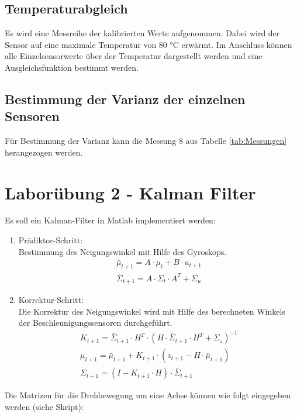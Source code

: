 \subsection{Temperaturabgleich}
Es wird eine Messreihe der kalibrierten Werte aufgenommen. Dabei wird der Sensor auf eine maximale Temperatur von 80 °C erwärmt. Im Anschluss können alle Einzelsensorwerte über der Temperatur dargestellt werden und eine Ausgleichsfunktion bestimmt werden.

\subsection{Bestimmung der Varianz der einzelnen Sensoren}
Für Bestimmung der Varianz kann die Messung 8 aus Tabelle \ref{tab:Messungen} herangezogen werden.

\section{Laborübung 2 - Kalman Filter}
Es soll ein Kalman-Filter in Matlab implementiert werden:
\begin{enumerate}
	\item	Prädiktor-Schritt: \\
	Bestimmung des Neigungswinkel mit Hilfe des Gyroskops.
	\begin{align}
		\bar{\mu}_{t+1}=A\cdot{\mu_t}+B\cdot{u_{t+1}} \\
		\bar{\Sigma}_{t+1}=A\cdot{\Sigma_t}\cdot{A^T}+\Sigma_u
		\label{eq: Predictor}
	\end{align}
	\item	Korrektur-Schritt: \\
	Die Korrektur des Neigungswinkel wird mit Hilfe des berechneten Winkels der Beschleunigungssensoren durchgeführt.
	\begin{align}
		K_{t+1}=\bar{\Sigma}_{t+1}\cdot{H^T}\cdot{(H\cdot{\bar{\Sigma}_{t+1}}\cdot{H^T}+\Sigma_z)^{-1}} \\
		\mu_{t+1}=\bar{\mu}_{t+1}+K_{t+1}\cdot{(z_{t+1}-H\cdot{\bar{\mu}_{t+1}})} \\
		\Sigma_{t+1}=(I-K_{t+1}\cdot{H})\cdot{\bar{\Sigma}_{t+1}}
		\label{eq: Corrector}
	\end{align}
\end{enumerate}
Die Matrizen für die Drehbewegung um eine Achse können wie folgt eingegeben werden (siehe Skript):

